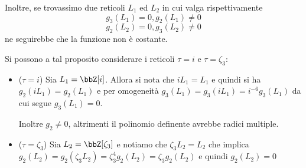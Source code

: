 Inoltre, se trovassimo due reticoli $L_1$ ed $L_2$ in cui valga
rispettivamente
$$g_3(L_1) = 0, g_2(L_1) \neq 0$$
$$g_2(L_2) = 0, g_3(L_2) \neq 0$$
ne seguirebbe che la funzione non è costante.

Si possono a tal proposito considerare i reticoli $\tau = i$ e
$\tau = \zeta_3$:
\begin{itemize}
\item ($\tau = i$) Sia $L_1 = \bbZ[i]$. Allora si nota che $i L_1 = L_1$
  e quindi si ha $g_2(i L_1) = g_2(L_1)$ e per omogeneità
  $g_3(L_1) = g_3(i L_1) = i^{-6} g_3(L_1)$ da cui segue $g_3(L_1) = 0$.

  Inoltre $g_2 \neq 0$, altrimenti il polinomio definente avrebbe radici
  multiple.

\item ($\tau = \zeta_3$) Sia $L_2 = \bbZ[\zeta_3]$ e notiamo che
  $\zeta_3 L_2 = L_2$ che implica $g_2(L_2) = g_2(\zeta_3 L_2) =
  \zeta_3^4 g_2(L_2) = \zeta_3 g_2(L_2)$ e quindi $g_2(L_2) = 0$
\end{itemize}

